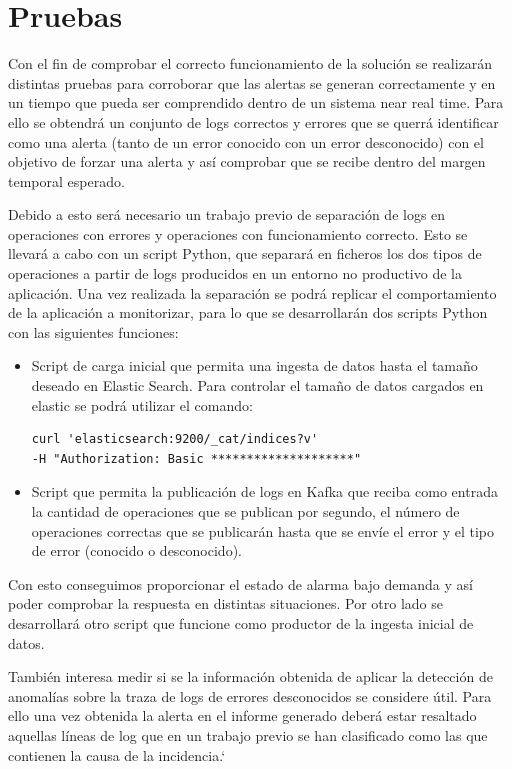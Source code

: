 \chapter{Pruebas}

Con el fin de comprobar el correcto funcionamiento de la solución se realizarán distintas pruebas para corroborar que las alertas se generan correctamente y en un tiempo que pueda ser comprendido dentro de un sistema near real time. Para ello se obtendrá un conjunto de logs correctos y errores que se querrá identificar como una alerta (tanto de un error conocido con un error desconocido) con el objetivo de forzar una alerta y así comprobar que se recibe dentro del margen temporal esperado.

Debido a esto será necesario un trabajo previo de separación de logs en operaciones con errores y operaciones con funcionamiento correcto. Esto se llevará a cabo con un script Python, que separará en ficheros los dos tipos de operaciones a partir de logs producidos en un entorno no productivo de la aplicación. Una vez realizada la separación se podrá replicar el comportamiento de la aplicación a monitorizar, para lo que se desarrollarán dos scripts Python con las siguientes funciones:

\begin{itemize}
\item Script de carga inicial que permita una ingesta de datos hasta el tamaño deseado en Elastic Search. Para controlar el tamaño de datos cargados en elastic se podrá utilizar el comando:

\begin{verbatim}
curl 'elasticsearch:9200/_cat/indices?v' 
-H "Authorization: Basic ********************"
\end{verbatim}

\item Script que permita la publicación de logs en Kafka que reciba como entrada la cantidad de operaciones que se publican por segundo, el número de operaciones correctas que se publicarán hasta que se envíe el error y el tipo de error (conocido o desconocido).
\end{itemize}

Con esto conseguimos proporcionar el estado de alarma bajo demanda y así poder comprobar la respuesta en distintas situaciones. Por otro lado se desarrollará otro script que funcione como productor de la ingesta inicial de datos.

También interesa medir si se la información obtenida de aplicar la detección de anomalías sobre la traza de logs de errores desconocidos se considere útil. Para ello una vez obtenida la alerta en el informe generado deberá estar resaltado aquellas líneas de log que en un trabajo previo se han clasificado como las que contienen la causa de la incidencia.`


